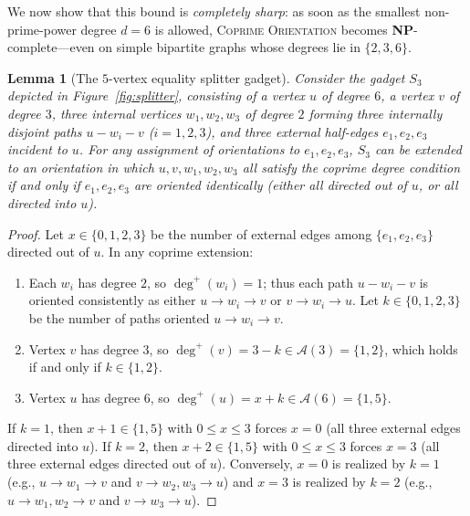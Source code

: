 \documentclass[11pt,a4paper]{article}
\newtheorem{lemma}[theorem]{Lemma}
\theoremstyle{definition}
\theoremstyle{remark}
\newcommand{\outdeg}{\deg^{+}}
\newcommand{\Aset}{\mathcal{A}}
\begin{document}
We now show that this bound is \emph{completely sharp}: as soon as the smallest non-prime-power degree $d = 6$ is allowed, \textsc{Coprime Orientation} becomes \textbf{NP}-complete—even on simple bipartite graphs whose degrees lie in $\{2, 3, 6\}$.

\begin{lemma}[The $5$-vertex equality splitter gadget]\label{lem:splitter}
Consider the gadget $S_3$ depicted in Figure~\ref{fig:splitter}, consisting of a vertex $u$ of degree $6$, a vertex $v$ of degree $3$, three internal vertices $w_1, w_2, w_3$ of degree $2$ forming three internally disjoint paths $u - w_i - v$ ($i = 1, 2, 3$), and three external half-edges $e_1, e_2, e_3$ incident to $u$. For any assignment of orientations to $e_1, e_2, e_3$, $S_3$ can be extended to an orientation in which $u, v, w_1, w_2, w_3$ all satisfy the coprime degree condition if and only if $e_1, e_2, e_3$ are oriented identically (either all directed out of $u$, or all directed into $u$).
\end{lemma}

\begin{proof}
Let $x \in \{0, 1, 2, 3\}$ be the number of external edges among $\{e_1, e_2, e_3\}$ directed out of $u$. In any coprime extension:
\begin{enumerate}[leftmargin=2em,itemsep=1pt]
  \item Each $w_i$ has degree $2$, so $\outdeg(w_i) = 1$; thus each path $u - w_i - v$ is oriented consistently as either $u \to w_i \to v$ or $v \to w_i \to u$. Let $k \in \{0, 1, 2, 3\}$ be the number of paths oriented $u \to w_i \to v$.
  \item Vertex $v$ has degree $3$, so $\outdeg(v) = 3 - k \in \Aset(3) = \{1, 2\}$, which holds if and only if $k \in \{1, 2\}$.
  \item Vertex $u$ has degree $6$, so $\outdeg(u) = x + k \in \Aset(6) = \{1, 5\}$.
\end{enumerate}
If $k = 1$, then $x + 1 \in \{1, 5\}$ with $0 \le x \le 3$ forces $x = 0$ (all three external edges directed into $u$). If $k = 2$, then $x + 2 \in \{1, 5\}$ with $0 \le x \le 3$ forces $x = 3$ (all three external edges directed out of $u$). Conversely, $x = 0$ is realized by $k = 1$ (e.g., $u \to w_1 \to v$ and $v \to w_2, w_3 \to u$) and $x = 3$ is realized by $k = 2$ (e.g., $u \to w_1, w_2 \to v$ and $v \to w_3 \to u$).
\end{proof}
\end{document}
